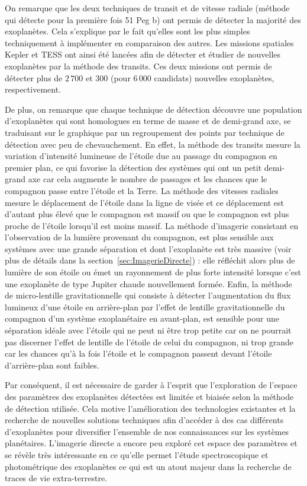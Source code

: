 On remarque que les deux techniques de transit et de vitesse radiale (méthode qui détecte pour la première fois 51 Peg b) ont permis de détecter la majorité des exoplanètes. Cela s'explique par le fait qu'elles sont les plus simples techniquement à implémenter en comparaison des autres. Les missions spatiales Kepler \citep{borucki2010} et \ac{TESS} \citep{ricker2016} ont ainsi été lancées afin de détecter et étudier de nouvelles exoplanètes par la méthode des transits. Ces deux missions ont permis de détecter plus de $2\,700$ et $300$ (pour $6\,000$ candidats) nouvelles exoplanètes, respectivement.

De plus, on remarque que chaque technique de détection découvre une population d'exoplanètes qui sont homologues en terme de masse et de demi-grand axe, se traduisant sur le graphique par un regroupement des points par technique de détection avec peu de chevauchement. En effet, la méthode des transits mesure la variation d'intensité lumineuse de l'étoile due au passage du compagnon en premier plan, ce qui favorise la détection des systèmes qui ont un petit demi-grand axe car cela augmente le nombre de passages et les chances que le compagnon passe entre l'étoile et la Terre. La méthode des vitesses radiales mesure le déplacement de l'étoile dans la ligne de visée et ce déplacement est d'autant plus élevé que le compagnon est massif ou que le compagnon est plus proche de l'étoile lorsqu'il est moins massif. La méthode d'imagerie consistant en l'observation de la lumière provenant du compagnon, est plus sensible aux systèmes avec une grande séparation et dont l'exoplanète est très massive (voir plus de détails dans la section~\ref{sec:ImagerieDirecte}) : elle réfléchit alors plus de lumière de son étoile ou émet un rayonnement de plus forte intensité lorsque c'est une exoplanète de type Jupiter chaude nouvellement formée. Enfin, la méthode de micro-lentille gravitationnelle qui consiste à détecter l'augmentation du flux lumineux d'une étoile en arrière-plan par l'effet de lentille gravitationnelle du compagnon d'un système exoplanétaire en avant-plan, est sensible pour une séparation idéale avec l'étoile qui ne peut ni être trop petite car on ne pourrait pas discerner l'effet de lentille de l'étoile de celui du compagnon, ni trop grande car les chances qu'à la fois l'étoile et le compagnon passent devant l'étoile d'arrière-plan sont faibles.

Par conséquent, il est nécessaire de garder à l'esprit que l'exploration de l'espace des paramètres des exoplanètes détectées est limitée et biaisée selon la méthode de détection utilisée. Cela motive l'amélioration des technologies existantes et la recherche de nouvelles solutions techniques afin d'accéder à des cas différents d'exoplanètes pour diversifier l'ensemble de nos connaissances sur les systèmes planétaires. L'imagerie directe a encore peu exploré cet espace des paramètres et se révèle très intéressante en ce qu'elle permet l'étude spectroscopique et photométrique des exoplanètes ce qui est un atout majeur dans la recherche de traces de vie extra-terrestre.


